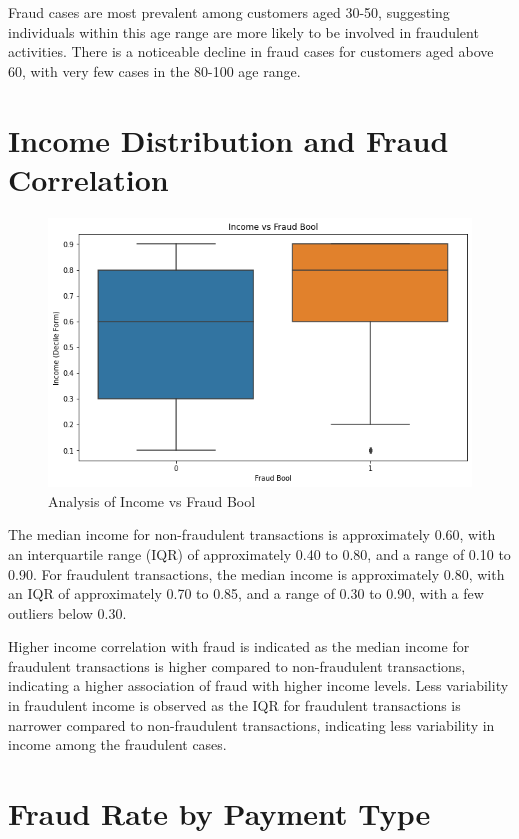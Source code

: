 \documentclass[12pt,a4paper]{report}
\begin{document}
Fraud cases are most prevalent among customers aged 30-50, suggesting individuals within this age range are more likely to be involved in fraudulent activities. There is a noticeable decline in fraud cases for customers aged above 60, with very few cases in the 80-100 age range.

\section{Income Distribution and Fraud Correlation}

\begin{figure}[h]
    \centering
    \includegraphics[width=\textwidth]{Income_vs_Fraud_Bool.png}
    \caption{Analysis of Income vs Fraud Bool}
    \label{fig:income_vs_fraud_bool}
\end{figure}

The median income for non-fraudulent transactions is approximately 0.60, with an interquartile range (IQR) of approximately 0.40 to 0.80, and a range of 0.10 to 0.90. For fraudulent transactions, the median income is approximately 0.80, with an IQR of approximately 0.70 to 0.85, and a range of 0.30 to 0.90, with a few outliers below 0.30.

Higher income correlation with fraud is indicated as the median income for fraudulent transactions is higher compared to non-fraudulent transactions, indicating a higher association of fraud with higher income levels. Less variability in fraudulent income is observed as the IQR for fraudulent transactions is narrower compared to non-fraudulent transactions, indicating less variability in income among the fraudulent cases.

\section{Fraud Rate by Payment Type}
\end{document}
